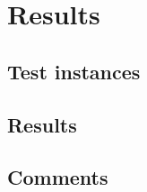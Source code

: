 
\chapter{Results}
\label{chap:results}

\section{Test instances}



\section{Results}
 






\section{Comments}

